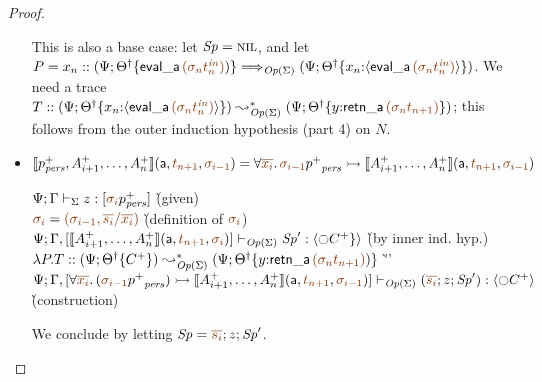 \begin{proof}
\begin{itemize}
  \smallskip
  This is also a base case: let ${\it Sp} = \textsc{nil}$, and let
  $P = x_n :: (\Psi; 
  \tackon{\opsubst{\Theta}}
  {{\sf eval\_a}\,\lf{(\sigma_{n}{t^{\it in}_n})})} \Longrightarrow_{\transop{\Sigma}}
   (\Psi; 
  \tackon{\opsubst{\Theta}}
  {x_{n}{:}{\susp{{\sf eval\_a}\,\lf{(\sigma_{n}{t^{\it in}_n})}}}})$.
We need a trace $T :: (\Psi; 
  \tackon{\opsubst{\Theta}}
  {x_{n}{:}{\susp{{\sf eval\_a}\,\lf{(\sigma_{n}{t^{\it in}_n})}}}})
  \leadsto^*_{\transop{\Sigma}} 
  (\Psi; \tackon{\opsubst{\Theta}}{y{:}{\sf retn\_a}\,\lf{(\sigma_n{t_{n+1}})}})$; 
  this follows from the
  outer induction hypothesis (part 4) on $N$. 
  \bigskip

\item $\opbasic{p^+_\mpers,A^+_{i+1},\ldots,A^+_n}{t_{n+1}}{\sigma_{i-1}} 
  = \forall \lf{\overline{x_i}}.\, \lf{\sigma_{i-1}}{p^+}_\mpers \lefti \opbasic{A^+_{i+1},\ldots,A^+_n}{t_{n+1}}{\sigma_{i-1}}$

  \begin{tabbing}
  $\slst{\Sigma}{\Psi}{\Gamma}{z}{[\lf{\sigma_i}{p^+_\mpers}]}$
  \` (given) 
  \\
  $\lf{\sigma_i} = \lf{(\sigma_{i-1}, \overline{s_i}/\overline{x_i})}$
  \` (definition of $\lf{\sigma_i}$)
  \\
  $\slst{\transop{\Sigma}}{\Psi}{\Gamma, [\opbasic{A^+_{i+1},\ldots,A^+_n}{t_{n+1}}{\sigma_{i}}]}{\Sp'}{\susp{{\ocircle} C^+ \} }}$
  \` (by inner ind. hyp.)
  \\
  $\lambda P.T :: (\Psi; \tackon{\opsubst{\Theta}}{C^+}) 
     \leadsto^*_{\transop{\Sigma}}
   (\Psi; \tackon{\opsubst{\Theta}}{y{:}{\sf retn\_a}\,\lf{({\sigma_n}t_{n+1})})}$
 \` ''\qquad\qquad~
  \\
  $\slst{\transop{\Sigma}}{\Psi}
    {\Gamma, [\forall \lf{\overline{x_i}}.\, (\lf{\sigma_{i-1}}{p^+}_\mpers)
                \lefti \opbasic{A^+_{i+1},\ldots,A^+_n}{t_{n+1}}{\sigma_{i-1}}]}
    {(\lf{\overline{s_i}}; z; \Sp')}
    {\susp{{\ocircle}C^+ }}$
  \\ 
  \` (construction)
  \end{tabbing}
  We conclude  by letting $\Sp = \lf{\overline{s_i}}; z; \Sp'$.
  \bigskip


\end{itemize}
\end{proof}
